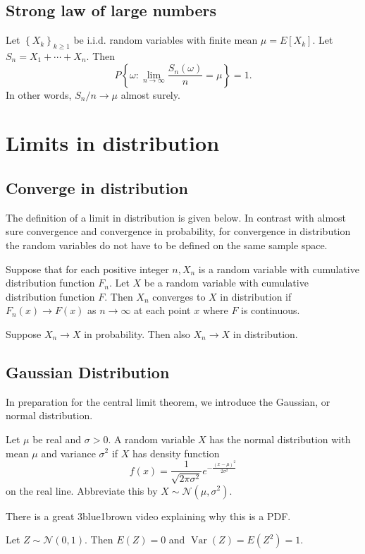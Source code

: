 \documentclass[11pt]{elegantbook}
\begin{document}
\section{ Strong law of large numbers}
\begin{theorem}
    Let $\left\{X_k\right\}_{k \geq 1}$ be i.i.d. random variables with finite mean $\mu=E\left[X_k\right]$. Let $S_n=X_1+\cdots+X_n$. Then
$$
P\left\{\omega: \lim _{n \rightarrow \infty} \frac{S_n(\omega)}{n}=\mu\right\}=1 .
$$
In other words, $S_n / n \rightarrow \mu$ almost surely.
\end{theorem}

\chapter{Limits in distribution}
\section{Converge in distribution}
The definition of a limit in distribution is given below. In contrast with almost sure convergence and convergence in probability, for convergence in distribution the random variables do not have to be defined on the same sample space.
\begin{definition}

 Suppose that for each positive integer $n, X_n$ is a random variable with cumulative distribution function $F_n$. Let $X$ be a random variable with cumulative distribution function $F$. Then $X_n$ converges to $X$ in distribution if $F_n(x) \rightarrow F(x)$ as $n \rightarrow \infty$ at each point $x$ where $F$ is continuous.
\end{definition}

\begin{theorem}
 Suppose $X_n \rightarrow X$ in probability. Then also $X_n \rightarrow X$ in distribution.
\end{theorem}
\section{Gaussian Distribution}

In preparation for the central limit theorem, we introduce the Gaussian, or normal distribution.
\begin{definition}
Let $\mu$ be real and $\sigma>0$. A random variable $X$ has the normal distribution with mean $\mu$ and variance $\sigma^2$ if $X$ has density function
$$
f(x)=\frac{1}{\sqrt{2 \pi \sigma^2}} e^{-\frac{(x-\mu)^2}{2 \sigma^2}}
$$
on the real line. Abbreviate this by $X \sim \mathcal{N}\left(\mu, \sigma^2\right)$.
\end{definition}
\begin{note}
    There is a great 3blue1brown video explaining why this is a PDF. 
\end{note}
\begin{theorem}
Let $Z \sim \mathcal{N}(0,1)$. Then $E(Z)=0$ and $\operatorname{Var}(Z)=E\left(Z^2\right)=1$.
\end{theorem}
\end{document}
